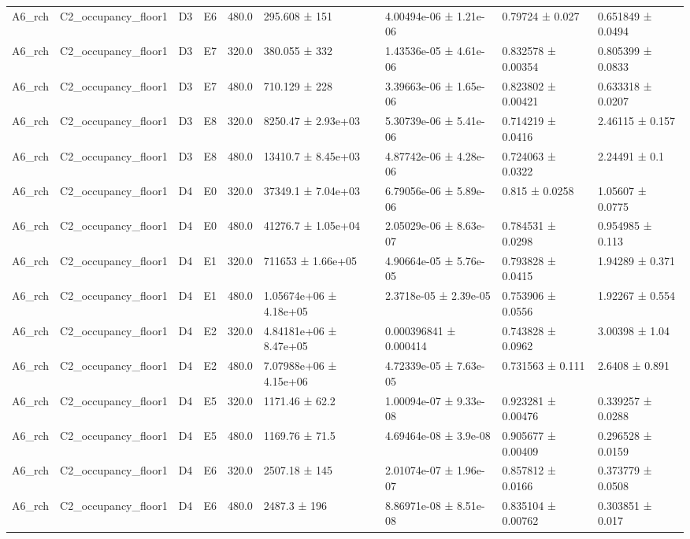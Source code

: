\begin{table}
\begin{tabular}{lllllllll}
A6\_rch & C2\_occupancy\_floor1 & D3 & E6 & 480.0 & 295.608 ± 151 & 4.00494e-06 ± 1.21e-06 & 0.79724 ± 0.027 & 0.651849 ± 0.0494 \\
A6\_rch & C2\_occupancy\_floor1 & D3 & E7 & 320.0 & 380.055 ± 332 & 1.43536e-05 ± 4.61e-06 & 0.832578 ± 0.00354 & 0.805399 ± 0.0833 \\
A6\_rch & C2\_occupancy\_floor1 & D3 & E7 & 480.0 & 710.129 ± 228 & 3.39663e-06 ± 1.65e-06 & 0.823802 ± 0.00421 & 0.633318 ± 0.0207 \\
A6\_rch & C2\_occupancy\_floor1 & D3 & E8 & 320.0 & 8250.47 ± 2.93e+03 & 5.30739e-06 ± 5.41e-06 & 0.714219 ± 0.0416 & 2.46115 ± 0.157 \\
A6\_rch & C2\_occupancy\_floor1 & D3 & E8 & 480.0 & 13410.7 ± 8.45e+03 & 4.87742e-06 ± 4.28e-06 & 0.724063 ± 0.0322 & 2.24491 ± 0.1 \\
A6\_rch & C2\_occupancy\_floor1 & D4 & E0 & 320.0 & 37349.1 ± 7.04e+03 & 6.79056e-06 ± 5.89e-06 & 0.815 ± 0.0258 & 1.05607 ± 0.0775 \\
A6\_rch & C2\_occupancy\_floor1 & D4 & E0 & 480.0 & 41276.7 ± 1.05e+04 & 2.05029e-06 ± 8.63e-07 & 0.784531 ± 0.0298 & 0.954985 ± 0.113 \\
A6\_rch & C2\_occupancy\_floor1 & D4 & E1 & 320.0 & 711653 ± 1.66e+05 & 4.90664e-05 ± 5.76e-05 & 0.793828 ± 0.0415 & 1.94289 ± 0.371 \\
A6\_rch & C2\_occupancy\_floor1 & D4 & E1 & 480.0 & 1.05674e+06 ± 4.18e+05 & 2.3718e-05 ± 2.39e-05 & 0.753906 ± 0.0556 & 1.92267 ± 0.554 \\
A6\_rch & C2\_occupancy\_floor1 & D4 & E2 & 320.0 & 4.84181e+06 ± 8.47e+05 & 0.000396841 ± 0.000414 & 0.743828 ± 0.0962 & 3.00398 ± 1.04 \\
A6\_rch & C2\_occupancy\_floor1 & D4 & E2 & 480.0 & 7.07988e+06 ± 4.15e+06 & 4.72339e-05 ± 7.63e-05 & 0.731563 ± 0.111 & 2.6408 ± 0.891 \\
A6\_rch & C2\_occupancy\_floor1 & D4 & E5 & 320.0 & 1171.46 ± 62.2 & 1.00094e-07 ± 9.33e-08 & 0.923281 ± 0.00476 & 0.339257 ± 0.0288 \\
A6\_rch & C2\_occupancy\_floor1 & D4 & E5 & 480.0 & 1169.76 ± 71.5 & 4.69464e-08 ± 3.9e-08 & 0.905677 ± 0.00409 & 0.296528 ± 0.0159 \\
A6\_rch & C2\_occupancy\_floor1 & D4 & E6 & 320.0 & 2507.18 ± 145 & 2.01074e-07 ± 1.96e-07 & 0.857812 ± 0.0166 & 0.373779 ± 0.0508 \\
A6\_rch & C2\_occupancy\_floor1 & D4 & E6 & 480.0 & 2487.3 ± 196 & 8.86971e-08 ± 8.51e-08 & 0.835104 ± 0.00762 & 0.303851 ± 0.017 \\

\end{tabular}
\end{table}
